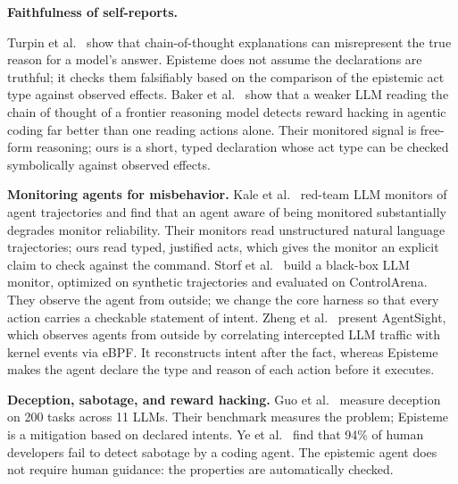 \documentclass{article}
\newcommand{\toolname}{{\sc Episteme}\xspace}
\theoremstyle{plain}
\theoremstyle{definition}
\theoremstyle{remark}
\begin{document}
\noindent\textbf{Faithfulness of self-reports.}

Turpin et al.~\cite{Turpin2023LanguageMD} show that chain-of-thought explanations can misrepresent the true reason for a model's answer. \toolname does not assume the declarations are truthful; it checks them falsifiably based on the comparison of the epistemic act type against observed effects.
Baker et al.~\cite{Baker2025MonitoringRM} show that a weaker LLM reading the chain of thought of a frontier reasoning model detects reward hacking in agentic coding far better than one reading actions alone. Their monitored signal is free-form reasoning; ours is a short, typed declaration whose act type can be checked symbolically against observed effects.
 
\noindent\textbf{Monitoring agents for misbehavior.}
Kale et al.~\cite{Kale2025ReliableWM} red-team LLM monitors of agent trajectories and find that an agent aware of being monitored substantially degrades monitor reliability. Their monitors read unstructured natural language trajectories; ours read typed, justified acts, which gives the monitor an explicit claim to check against the command.
Storf et al.~\cite{Storf2026ConstitutionalBM} build a black-box LLM monitor, optimized on synthetic trajectories and evaluated on ControlArena. They observe the agent from outside; we change the core harness so that every action carries a checkable statement of intent.
Zheng et al.~\cite{zheng2025agentsight} present AgentSight, which observes agents from outside by correlating intercepted LLM traffic with kernel events via eBPF. It reconstructs intent after the fact, whereas \toolname makes the agent declare the type and reason of each action before it executes.

\noindent\textbf{Deception, sabotage, and reward hacking.}
Guo et al.~\cite{Guo2025AreYA} measure deception on 200 tasks across 11 LLMs. Their benchmark measures the problem; \toolname is a mitigation based on declared intents.
Ye et al.~\cite{Ye2026CodingW} find that 94\% of human developers fail to detect sabotage by a coding agent. The epistemic agent does not require human guidance: the properties are automatically checked.
\end{document}
